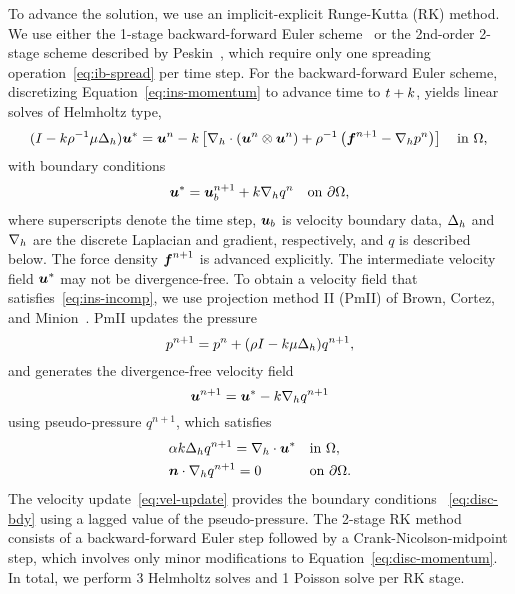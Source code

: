 To advance the solution, we use an implicit-explicit Runge-Kutta (RK) method. We use
either the 1-stage backward-forward Euler scheme~\cite{Ascher:1997tm} or the 2nd-order
2-stage scheme described by Peskin~\cite{Peskin:2002go}, which require only one spreading
operation~\eqref{eq:ib-spread} per time step. For the backward-forward Euler scheme,
discretizing Equation~\eqref{eq:ins-momentum} to advance time to $t+k$, yields
linear solves of Helmholtz type,
\begin{equation}\label{eq:disc-momentum}
    (I - \timestep\rho^{-1}\mu \laplacian_h) \u^\ast = \u^n - \timestep\left[\div[h]\left(\u^n\otimes\u^n\right) + \rho^{-1}\left(\f^{n+1} - \grad[h]p^n\right)\right] \quad\text{in}~\domain, \\
\end{equation}
with boundary conditions
\begin{equation}\label{eq:disc-bdy}
    \u^\ast = \u^{n+1}_b + \timestep \grad[h] q^{n} \quad\text{on}~\partial\domain,
\end{equation}
where superscripts denote the time step, $\boldsymbol{u}_b$ is velocity boundary data, $\Delta_h$
and $\grad[h]$ are the discrete Laplacian and gradient, respectively, and $q$ is
described below. The force density $\boldsymbol{f}^{n+1}$ is advanced explicitly. The intermediate
velocity field $\boldsymbol{u}^\ast$ may not be divergence-free. To obtain a velocity field that
satisfies~\eqref{eq:ins-incomp}, we use projection method II (PmII) of Brown, Cortez, and
Minion~\cite{Brown:2001bq}. PmII updates the pressure
\begin{equation*}
    p^{n+1} = p^n + (\rho I - k\mu\Delta_h)q^{n+1},
\end{equation*}
and generates the divergence-free velocity field
\begin{equation}\label{eq:vel-update}
    \u^{n+1} = \u^\ast - \timestep\grad[h]q^{n+1}
\end{equation}
using pseudo-pressure $q^{n+1}$, which satisfies
\begin{equation}
\begin{alignedat}{2}
    &\alpha k \laplacian_h q^{n+1} = \div[h]\u^\ast &&\quad \text{in}~\domain, \\
    &\n\cdot\grad[h] q^{n+1} = 0                    &&\quad \text{on}~\partial\domain.
\end{alignedat}
\end{equation}
The velocity update~\eqref{eq:vel-update} provides the boundary conditions~%
\eqref{eq:disc-bdy} using a lagged value of the pseudo-pressure. The 2-stage RK method
consists of a backward-forward Euler step followed by a Crank-Nicolson-midpoint step,
which involves only minor modifications to Equation~\eqref{eq:disc-momentum}. In total,
we perform 3 Helmholtz solves and 1 Poisson solve per RK stage.

